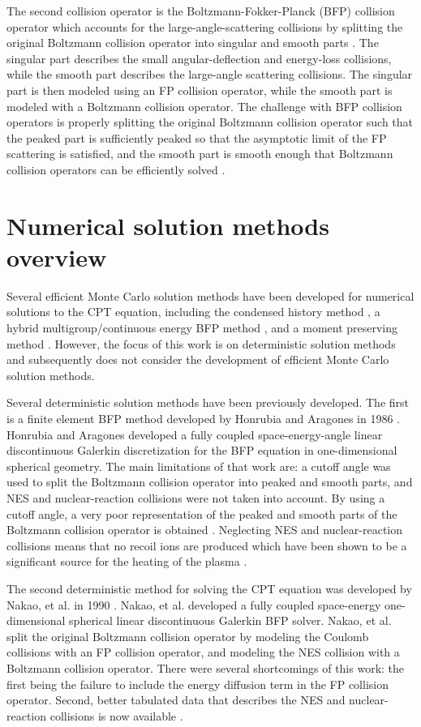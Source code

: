 \documentclass[../main.tex]{subfiles}
\begin{document}
The second collision operator is the Boltzmann-Fokker-Planck (BFP) collision operator which accounts for the large-angle-scattering collisions by splitting the original Boltzmann collision operator into singular and smooth parts \cite{Ligou-1986}. The singular part describes the small angular-deflection and energy-loss collisions, while the smooth part describes the large-angle scattering collisions. The singular part is then modeled using an FP collision operator, while the smooth part is modeled with a Boltzmann collision operator. The challenge with BFP collision operators is properly splitting the original Boltzmann collision operator such that the peaked part is sufficiently peaked so that the asymptotic limit of the FP scattering is satisfied, and the smooth part is smooth enough that Boltzmann collision operators can be efficiently solved \cite{Pomraning-1992}. 

\section{Numerical solution methods overview}
Several efficient Monte Carlo solution methods have been developed for numerical solutions to the CPT equation, including the condensed history method \cite{Berger-1963}, a hybrid multigroup/continuous energy BFP method \cite{Morel-1996}, and a moment preserving method \cite{Dixon-2015}. However, the focus of this work is on deterministic solution methods and subsequently does not consider the development of efficient Monte Carlo solution methods. 

Several deterministic solution methods have been previously developed. The first is a finite element BFP method developed by Honrubia and Aragones in 1986 \cite{Honrubia-1986}. Honrubia and Aragones developed a fully coupled space-energy-angle linear discontinuous Galerkin discretization for the BFP equation in one-dimensional spherical geometry. The main limitations of that work are: a cutoff angle was used to split the Boltzmann collision operator into peaked and smooth parts, and NES and nuclear-reaction collisions were not taken into account. By using a cutoff angle, a very poor representation of the peaked and smooth parts of the Boltzmann collision operator is obtained \cite{Landesman-1989}. Neglecting NES and nuclear-reaction collisions  means that no recoil ions are produced which have been shown to be a significant source for the heating of the plasma \cite{Nakao-1988}.

The second deterministic method for solving the CPT equation was developed by Nakao, et al. in 1990 \cite{Nakao-1990}. Nakao, et al. developed a fully coupled space-energy one-dimensional spherical linear discontinuous Galerkin BFP solver. Nakao, et al. split the original Boltzmann collision operator by modeling the Coulomb collisions with an FP collision operator, and modeling the NES collision with a Boltzmann collision operator. There were several shortcomings of this work: the first being the failure to include the energy diffusion term in the FP collision operator. Second, better tabulated data that describes the NES and nuclear-reaction collisions is now available \cite{Hale-1983}. 
\end{document}
